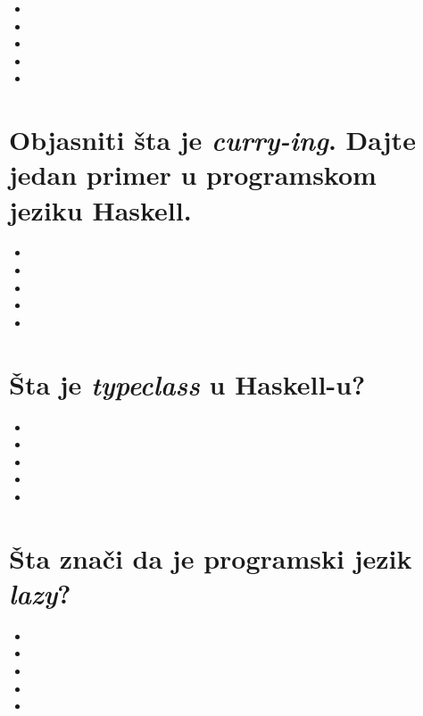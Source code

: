 \documentclass[11pt]{article}
\begin{document}
\begin{itemize}
\item

\item

\item

\item

\item
\end{itemize}

\section{Objasniti šta je \emph{curry-ing}. Dajte jedan primer u programskom jeziku Haskell.}
\label{sec:org458bfac}

\begin{itemize}
\item

\item

\item

\item

\item
\end{itemize}

\section{Šta je \emph{typeclass} u Haskell-u?}
\label{sec:orgb99a31f}

\begin{itemize}
\item

\item

\item

\item

\item
\end{itemize}

\section{Šta znači da je programski jezik \emph{lazy}?}
\label{sec:orgae56ff5}

\begin{itemize}
\item

\item

\item

\item

\item
\end{itemize}
\end{document}
